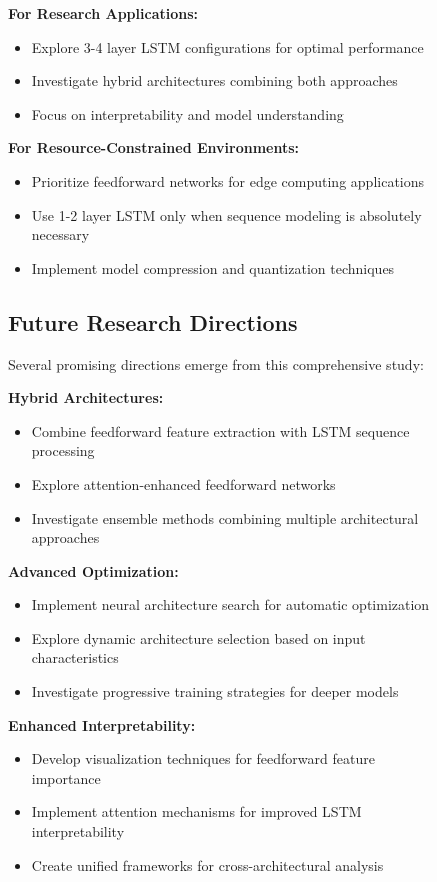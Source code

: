 \documentclass[a4paper, journal]{IEEEtran}
\begin{document}
\begin{figure}[!t]
\textbf{For Research Applications:}
\begin{itemize}
    \item Explore 3-4 layer LSTM configurations for optimal performance
    \item Investigate hybrid architectures combining both approaches
    \item Focus on interpretability and model understanding
\end{itemize}

\textbf{For Resource-Constrained Environments:}
\begin{itemize}
    \item Prioritize feedforward networks for edge computing applications
    \item Use 1-2 layer LSTM only when sequence modeling is absolutely necessary
    \item Implement model compression and quantization techniques
\end{itemize}

\subsection{Future Research Directions}

Several promising directions emerge from this comprehensive study:

\textbf{Hybrid Architectures:}
\begin{itemize}
    \item Combine feedforward feature extraction with LSTM sequence processing
    \item Explore attention-enhanced feedforward networks
    \item Investigate ensemble methods combining multiple architectural approaches
\end{itemize}

\textbf{Advanced Optimization:}
\begin{itemize}
    \item Implement neural architecture search for automatic optimization
    \item Explore dynamic architecture selection based on input characteristics
    \item Investigate progressive training strategies for deeper models
\end{itemize}

\textbf{Enhanced Interpretability:}
\begin{itemize}
    \item Develop visualization techniques for feedforward feature importance
    \item Implement attention mechanisms for improved LSTM interpretability
    \item Create unified frameworks for cross-architectural analysis
\end{itemize}


\end{figure}
\end{document}
